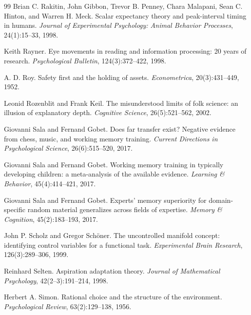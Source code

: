 \documentclass[11pt,a4paper]{article}
\theoremstyle{remark}
\begin{document}
\begin{thebibliography}{99}
Brian C. Rakitin, John Gibbon, Trevor B. Penney, Chara Malapani, Sean C. Hinton, and Warren H. Meck.
\newblock Scalar expectancy theory and peak-interval timing in humans.
\newblock \emph{Journal of Experimental Psychology: Animal Behavior Processes}, 24(1):15--33, 1998.

Keith Rayner.
\newblock Eye movements in reading and information processing: 20 years of research.
\newblock \emph{Psychological Bulletin}, 124(3):372--422, 1998.

A. D. Roy.
\newblock Safety first and the holding of assets.
\newblock \emph{Econometrica}, 20(3):431--449, 1952.

Leonid Rozenblit and Frank Keil.
\newblock The misunderstood limits of folk science: an illusion of explanatory depth.
\newblock \emph{Cognitive Science}, 26(5):521--562, 2002.

Giovanni Sala and Fernand Gobet.
\newblock Does far transfer exist? Negative evidence from chess, music, and working memory training.
\newblock \emph{Current Directions in Psychological Science}, 26(6):515--520, 2017.

Giovanni Sala and Fernand Gobet.
\newblock Working memory training in typically developing children: a meta-analysis of the available evidence.
\newblock \emph{Learning \& Behavior}, 45(4):414--421, 2017.

Giovanni Sala and Fernand Gobet.
\newblock Experts' memory superiority for domain-specific random material generalizes across fields of expertise.
\newblock \emph{Memory \& Cognition}, 45(2):183--193, 2017.

John P. Scholz and Gregor Sch\"oner.
\newblock The uncontrolled manifold concept: identifying control variables for a functional task.
\newblock \emph{Experimental Brain Research}, 126(3):289--306, 1999.

Reinhard Selten.
\newblock Aspiration adaptation theory.
\newblock \emph{Journal of Mathematical Psychology}, 42(2--3):191--214, 1998.

Herbert A. Simon.
\newblock Rational choice and the structure of the environment.
\newblock \emph{Psychological Review}, 63(2):129--138, 1956.


\end{thebibliography}
\end{document}
